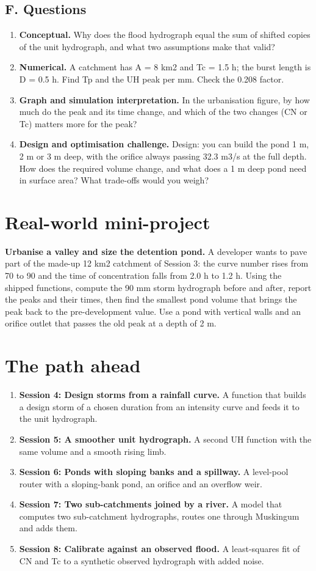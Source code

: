 \documentclass[11pt,a4paper]{article}
\begin{document}
\subsection*{F. Questions}
\begin{enumerate}[nosep]
\item \textbf{Conceptual.} Why does the flood hydrograph equal the sum of shifted copies of the unit hydrograph, and what two assumptions make that valid?
\item \textbf{Numerical.} A catchment has A = 8 km2 and Tc = 1.5 h; the burst length is D = 0.5 h. Find Tp and the UH peak per mm. Check the 0.208 factor.
\item \textbf{Graph and simulation interpretation.} In the urbanisation figure, by how much do the peak and its time change, and which of the two changes (CN or Tc) matters more for the peak?
\item \textbf{Design and optimisation challenge.} Design: you can build the pond 1 m, 2 m or 3 m deep, with the orifice always passing 32.3 m3/s at the full depth. How does the required volume change, and what does a 1 m deep pond need in surface area? What trade-offs would you weigh?
\end{enumerate}

\section{Real-world mini-project}
\textbf{Urbanise a valley and size the detention pond.} A developer wants to pave part of the made-up 12 km2 catchment of Session 3: the curve number rises from 70 to 90 and the time of concentration falls from 2.0 h to 1.2 h. Using the shipped functions, compute the 90 mm storm hydrograph before and after, report the peaks and their times, then find the smallest pond volume that brings the peak back to the pre-development value. Use a pond with vertical walls and an orifice outlet that passes the old peak at a depth of 2 m.

\section{The path ahead}
\begin{enumerate}[nosep]
\item \textbf{Session 4: Design storms from a rainfall curve.} A function that builds a design storm of a chosen duration from an intensity curve and feeds it to the unit hydrograph.
\item \textbf{Session 5: A smoother unit hydrograph.} A second UH function with the same volume and a smooth rising limb.
\item \textbf{Session 6: Ponds with sloping banks and a spillway.} A level-pool router with a sloping-bank pond, an orifice and an overflow weir.
\item \textbf{Session 7: Two sub-catchments joined by a river.} A model that computes two sub-catchment hydrographs, routes one through Muskingum and adds them.
\item \textbf{Session 8: Calibrate against an observed flood.} A least-squares fit of CN and Tc to a synthetic observed hydrograph with added noise.
\end{enumerate}
\end{document}
